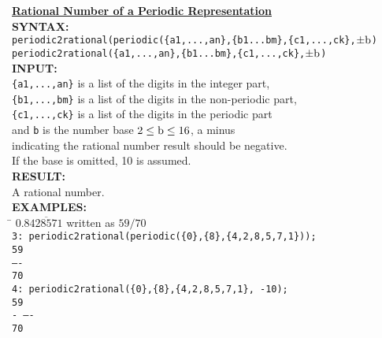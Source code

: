\documentclass[11pt,a4paper]{article}
\begin{document}
\begin{tabbing}
  \textbf{\underline{Rational Number of a Periodic Representation}}\\[\baselineskip]
\textbf{SYNTAX:}\\
\hspace{3mm} \= \texttt{periodic2rational(periodic(\{a1,...,an\},\{b1...bm\},\{c1,...,ck\},$\pm{\rm b}$)}\\
   \> \texttt{periodic2rational(\{a1,...,an\},\{b1...bm\},\{c1,...,ck\},$\pm{\rm b}$)}\\[\baselineskip]

\textbf{INPUT:}\\
     \> \texttt{\{a1,...,an\}} is a list of the digits in the integer part,\\
     \> \texttt{\{b1,...,bm\}} is a list of the digits in the non-periodic part,\\
     \>\texttt{\{c1,...,ck\}} is a list of the digits in the periodic part\\
     \> and {\tt b} is the number base $2 \leq {\rm b} \leq 16$, a minus\\
     \> indicating the rational number result should be negative. \\
     \> If the base is omitted, 10 is assumed. \\[\baselineskip]

\textbf{RESULT:}\\
     \> A rational number.\\[\baselineskip]

\textbf{EXAMPLES:}\\[\baselineskip]
\hspace{10mm} \= $0.8\overline{428571}$ written as $59/70$ \\
    \> \texttt{3: periodic2rational(periodic(\{0\},\{8\},\{4,2,8,5,7,1\}));}
\\[\baselineskip]
    \> \hspace{1mm} {\tt 59}\\
    \> {\tt ----}\\
    \> \hspace{1mm} {\tt 70}\\[\baselineskip]
    \> \texttt{4: periodic2rational(\{0\},\{8\},\{4,2,8,5,7,1\}, -10);}
\\[\baselineskip]
    \> \hspace{4mm} \texttt{59}\\
    \> \texttt{- ----}\\
    \> \hspace{4mm} \texttt{70}
\end{tabbing}
\end{document}

